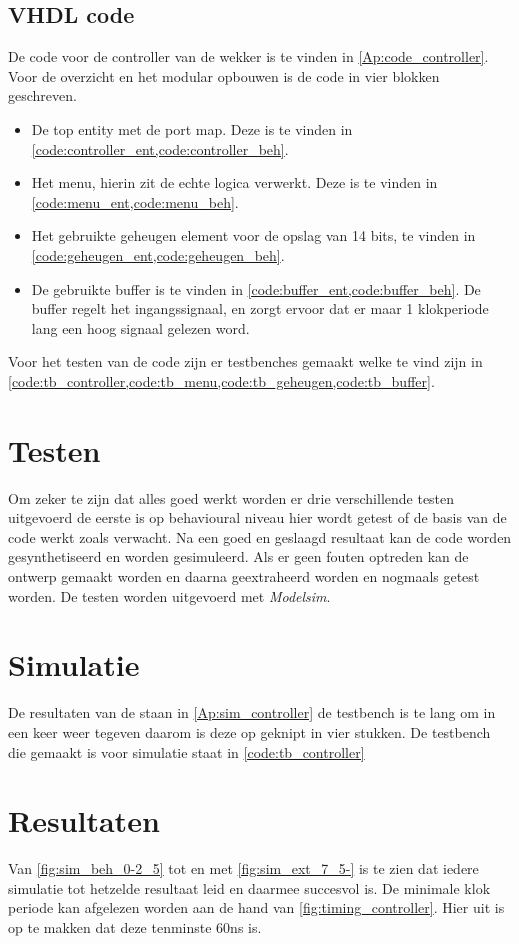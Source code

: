 \subsection{VHDL code}
De code voor de controller van de wekker is te vinden in \cref{Ap:code_controller}. Voor de overzicht en het modular opbouwen is de code in vier blokken geschreven.
\begin{itemize}[nolistsep]
\item De top entity met de port map. Deze is te vinden in \cref{code:controller_ent,code:controller_beh}.
\item Het menu, hierin zit de echte logica verwerkt. Deze is te vinden in \cref{code:menu_ent,code:menu_beh}.
\item Het gebruikte geheugen element voor de opslag van 14 bits, te vinden in \cref{code:geheugen_ent,code:geheugen_beh}.
\item De gebruikte buffer is te vinden in \cref{code:buffer_ent,code:buffer_beh}. De buffer regelt het ingangssignaal, en zorgt ervoor dat er maar 1 klokperiode lang een hoog signaal gelezen word.
\end{itemize}
Voor het testen van de code zijn er testbenches gemaakt welke te vind zijn in \cref{code:tb_controller,code:tb_menu,code:tb_geheugen,code:tb_buffer}.

\section{Testen}
Om zeker te zijn dat alles goed werkt worden er drie verschillende testen uitgevoerd de eerste is op behavioural niveau hier wordt getest of de basis van de code werkt zoals verwacht. Na een goed en geslaagd resultaat kan de code worden gesynthetiseerd en worden gesimuleerd. Als er geen fouten optreden kan de ontwerp gemaakt worden en daarna geextraheerd worden en nogmaals getest worden. De testen worden uitgevoerd met \emph{Modelsim}.


\section{Simulatie}
De resultaten van de staan in \cref{Ap:sim_controller} de testbench is te lang om in een keer weer tegeven daarom is deze op geknipt in vier stukken. De testbench die gemaakt is voor simulatie staat in \cref{code:tb_controller}
\section{Resultaten}
Van \cref{fig:sim_beh_0-2_5} tot en met \cref{fig:sim_ext_7_5-} is te zien dat iedere simulatie tot hetzelde resultaat leid en daarmee succesvol is.
De minimale klok periode kan afgelezen worden aan de hand van \cref{fig:timing_controller}. Hier uit is op te makken dat deze tenminste 60ns is.
